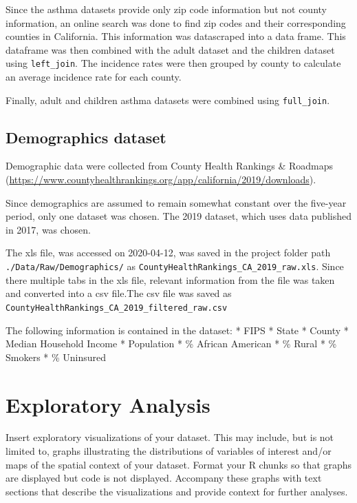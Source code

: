 \documentclass[12pt,]{article}
\begin{document}
Since the asthma datasets provide only zip code information but not
county information, an online search was done to find zip codes and
their corresponding counties in California. This information was
datascraped into a data frame. This dataframe was then combined with the
adult dataset and the children dataset using \texttt{left\_join}. The
incidence rates were then grouped by county to calculate an average
incidence rate for each county.

Finally, adult and children asthma datasets were combined using
\texttt{full\_join}.

\hypertarget{demographics-dataset}{%
\subsection{Demographics dataset}\label{demographics-dataset}}

Demographic data were collected from County Health Rankings \& Roadmaps
(\url{https://www.countyhealthrankings.org/app/california/2019/downloads}).

Since demographics are assumed to remain somewhat constant over the
five-year period, only one dataset was chosen. The 2019 dataset, which
uses data published in 2017, was chosen.

The xls file, was accessed on 2020-04-12, was saved in the project
folder path \texttt{./Data/Raw/Demographics/} as
\texttt{CountyHealthRankings\_CA\_2019\_raw.xls}. Since there multiple
tabs in the xls file, relevant information from the file was taken and
converted into a csv file.The csv file was saved as
\texttt{CountyHealthRankings\_CA\_2019\_filtered\_raw.csv}

The following information is contained in the dataset: * FIPS * State *
County * Median Household Income * Population * \% African American * \%
Rural * \% Smokers * \% Uninsured

\newpage

\hypertarget{exploratory-analysis}{%
\section{Exploratory Analysis}\label{exploratory-analysis}}

Insert exploratory visualizations of your dataset. This may include, but
is not limited to, graphs illustrating the distributions of variables of
interest and/or maps of the spatial context of your dataset. Format your
R chunks so that graphs are displayed but code is not displayed.
Accompany these graphs with text sections that describe the
visualizations and provide context for further analyses.
\end{document}
